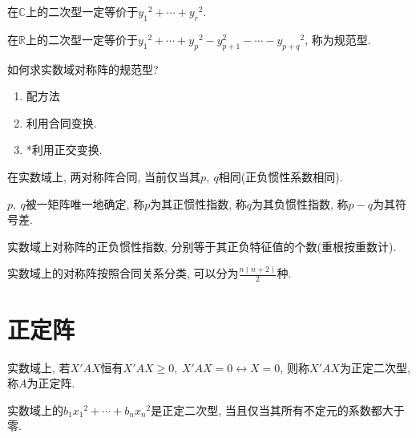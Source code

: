 \begin{inference}
    在$\mathbb{C}$上的二次型一定等价于${y_1}^2+\cdots+{y_r}^2$.\par
    在$\mathbb{R}$上的二次型一定等价于${y_1}^2+\cdots+{y_p}^2-{y_{p+1}^2-\cdots-{y_{p+q}}^2}$, 称为规范型.
\end{inference}

\begin{example}
    如何求实数域对称阵的规范型?\par
    \begin{enumerate}[itemindent=1em]
        \item 配方法
        \item 利用合同变换.
        \item *利用正交变换.
    \end{enumerate}
\end{example}

\begin{theorem}[惯性定理]
    在实数域上, 两对称阵合同, 当前仅当其$p,\ q$相同(正负惯性系数相同).
\end{theorem}

\begin{definition}[惯性指数]
    $p,\ q$被一矩阵唯一地确定, 称$p$为其正惯性指数, 称$q$为其负惯性指数, 称$p-q$为其符号差.
\end{definition}

\begin{inference}
    实数域上对称阵的正负惯性指数, 分别等于其正负特征值的个数(重根按重数计).
\end{inference}

\begin{inference}
    实数域上的对称阵按照合同关系分类, 可以分为$\frac{n(n+2)}{2}$种.
\end{inference}

\section{ 正定阵 }

\begin{definition}[正定阵]
    实数域上, 若$X'AX$恒有$X'AX\ge 0,\ X'AX=0\leftrightarrow X=0$, 则称$X'AX$为正定二次型, 称$A$为正定阵.
\end{definition}

\begin{example}
    实数域上的$b_1{x_1}^2+\cdots+b_n{x_n}^2$是正定二次型, 当且仅当其所有不定元的系数都大于零.
\end{example}


